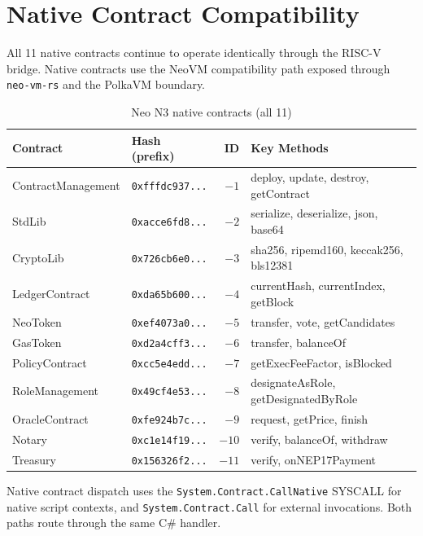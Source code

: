 \documentclass[11pt,a4paper]{article}
\begin{document}
\section{Native Contract Compatibility}
\label{sec:native-contracts}

All 11 native contracts continue to operate identically through the RISC-V
bridge. Native contracts use the NeoVM compatibility path exposed through
\texttt{neo-vm-rs} and the PolkaVM boundary.

\begin{table}[H]
\centering
\begin{tabular}{llrl}
\toprule
\textbf{Contract} & \textbf{Hash (prefix)} & \textbf{ID} & \textbf{Key Methods} \\
\midrule
ContractManagement & \texttt{0xfffdc937...} & $-1$ & deploy, update, destroy, getContract \\
StdLib             & \texttt{0xacce6fd8...} & $-2$ & serialize, deserialize, json, base64 \\
CryptoLib          & \texttt{0x726cb6e0...} & $-3$ & sha256, ripemd160, keccak256, bls12381 \\
LedgerContract     & \texttt{0xda65b600...} & $-4$ & currentHash, currentIndex, getBlock \\
NeoToken           & \texttt{0xef4073a0...} & $-5$ & transfer, vote, getCandidates \\
GasToken           & \texttt{0xd2a4cff3...} & $-6$ & transfer, balanceOf \\
PolicyContract     & \texttt{0xcc5e4edd...} & $-7$ & getExecFeeFactor, isBlocked \\
RoleManagement     & \texttt{0x49cf4e53...} & $-8$ & designateAsRole, getDesignatedByRole \\
OracleContract     & \texttt{0xfe924b7c...} & $-9$ & request, getPrice, finish \\
Notary             & \texttt{0xc1e14f19...} & $-10$ & verify, balanceOf, withdraw \\
Treasury           & \texttt{0x156326f2...} & $-11$ & verify, onNEP17Payment \\
\bottomrule
\end{tabular}
\caption{Neo N3 native contracts (all 11)}
\label{tab:native-contracts}
\end{table}

Native contract dispatch uses the \texttt{System.Contract.CallNative} SYSCALL
for native script contexts, and \texttt{System.Contract.Call} for external
invocations. Both paths route through the same C\# handler.
\end{document}
